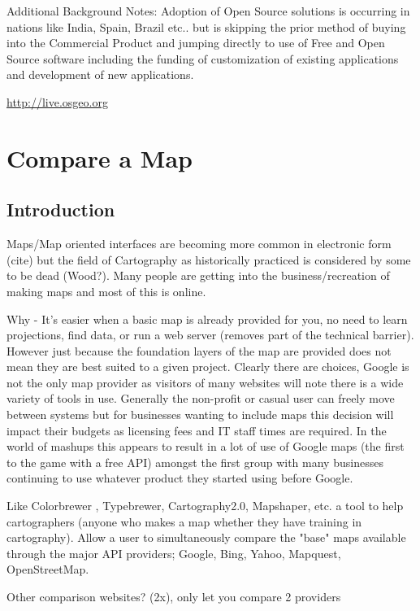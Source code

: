 \documentclass[12pt,letterpaper]{article}
\begin{document}
Additional Background Notes: Adoption of Open Source solutions is occurring in nations like India, Spain, Brazil etc.. but is skipping the prior method of buying into the Commercial Product and jumping directly to use of Free and Open Source software including the funding of customization of existing applications and development of new applications.

\url{http://live.osgeo.org}

\section{Compare a Map}
\subsection{Introduction}
Maps/Map oriented interfaces are becoming more common in electronic form (cite) but the field of Cartography as historically practiced is considered by some to be dead (Wood?). Many people are getting into the business/recreation of making maps and most of this is online.

Why - It's easier when a basic map is already provided for you, no need to learn projections, find data, or run a web server (removes part of the technical barrier). However just because the foundation layers of the map are provided does not mean they are best suited to a given project. Clearly there are choices, Google is not the only map provider as visitors of many websites will note there is a wide variety of tools in use. Generally the non-profit or casual user can freely move between systems but for businesses wanting to include maps this decision will impact their budgets as licensing fees and IT staff times are required. In the world of mashups this appears to result in a lot of use of Google maps (the first to the game with a free API) amongst the first group with many businesses continuing to use whatever product they started using before Google.  


Like Colorbrewer \parencite{Brewer2003}, Typebrewer, Cartography2.0, Mapshaper, etc. a tool to help cartographers (anyone who makes a map whether they have training in cartography). Allow a user to simultaneously compare the "base" maps available through the major API providers; Google, Bing, Yahoo, Mapquest, OpenStreetMap.

Other comparison websites? (2x), only let you compare 2 providers
\end{document}
